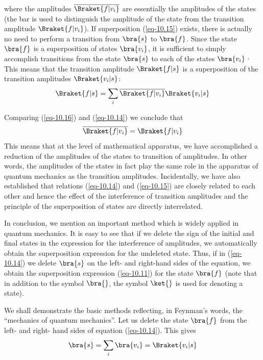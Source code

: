 \documentclass[a4paper,sfsidenotes,colorlinks=true]{tufte-book}
\numberwithin{equation}{section}
\numberwithin{figure}{section}
\begin{document}
where the amplitudes $\overline{\Braket{f|v_{i}}}$ are essentially the
amplitudes of the states (the bar is used to distinguish the amplitude
of the state from the transition amplitude $\Braket{f|v_{i}}$). If
superposition (\ref{eq-10.15}) exists, there is actually no need to
perform a transition from $\bra{s}$ to $\bra{f}$. Since the state
$\bra{f}$ is a superposition of states $\bra{v_{i}}$, it is sufficient
to simply accomplish transitions from the state $\bra{s}$ to each of
the states $\bra{v_{i}}$· This means that the transition amplitude $\Braket{f|s}$ is a superposition of the transition amplitudes $\Braket{v_{i}|s}$:
\begin{equation}%
\Braket{f|s} = \sum_{i} \overline{\Braket{f|v_{i}}}\Braket{v_{i}|s}
\label{eq-10.16} 
\end{equation}

Comparing (\ref{eq-10.16}) and (\ref{eq-10.14}) we conclude that 
\begin{equation}%
\overline{\Braket{f|v_{i}}} = \Braket{f|v_{i}}
\label{eq-10.17} 
\end{equation}
This means that at the level of mathematical apparatus, we have
accomplished a reduction of the amplitudes of the states to transition
of amplitudes. In other words, the amplitudes of the states in fact
play the same role in the apparatus of quantum mechanics as the
transition amplitudes. Incidentally, we have also established that
relations (\ref{eq-10.14}) and (\ref{eq-10.15}) are closely related to each other and
hence the effect of the interference of transition amplitudes and
the principle of the superposition of states are directly
interrelated.

In conclusion, we mention an important method which is widely applied
in quantum mechanics. It is easy to see that if we delete the sign of
the initial and final states in the expression for the interference of
amplitudes, we automatically obtain the superposition expression for
the undeleted state. Thus, if in (\ref{eq-10.14}) we delete $\bra{s}$ on the left-
and right-hand sides of the equation, we obtain the superposition
expression (\ref{eq-10.11}) for the state $\bra{f}$ (note that in addition to the
symbol $\bra{}$, the symbol $\ket{}$ is used for denoting a state).

We shall demonstrate 
the basic methods reflecting, in Feynman's words, the ``mechanics of
quantum mechanics''. Let us delete the state $\bra{f}$ from the left- and
right- hand sides of equation (\ref{eq-10.14}). This gives
\begin{equation}%
\bra{s} = \sum_{i} \bra{v_{i}} = \Braket{v_{i}|s}
\label{eq-10.18} 
\end{equation}
\end{document}
